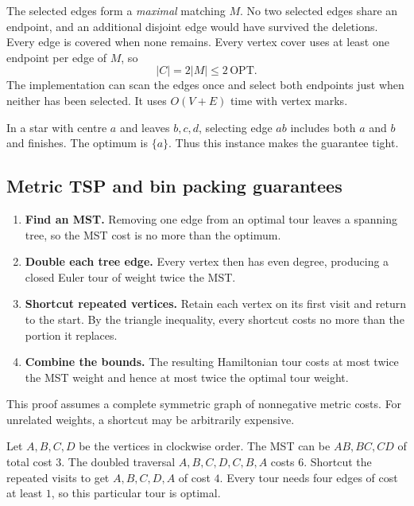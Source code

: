 \documentclass[12pt,a4paper]{article}
\begin{document}
The selected edges form a \emph{maximal} matching $M$. No two selected edges share an endpoint, and an additional disjoint edge would have survived the deletions. Every edge is covered when none remains. Every vertex cover uses at least one endpoint per edge of $M$, so
\[
|C|=2|M|\le 2\,\mathrm{OPT}.
\]
The implementation can scan the edges once and select both endpoints just when neither has been selected. It uses $O(V+E)$ time with vertex marks.
\begin{tcolorbox}[examplebox, title={A cover can attain exactly twice the optimum}]
In a star with centre $a$ and leaves $b,c,d$, selecting edge $ab$ includes both $a$ and $b$ and finishes. The optimum is $\{a\}$. Thus this instance makes the guarantee tight.
\end{tcolorbox}

\subsection{Metric TSP and bin packing guarantees}
\begin{enumerate}[leftmargin=*, itemsep=3pt, topsep=4pt]
  \item \textbf{Find an MST.} Removing one edge from an optimal tour leaves a spanning tree, so the MST cost is no more than the optimum.
  \item \textbf{Double each tree edge.} Every vertex then has even degree, producing a closed Euler tour of weight twice the MST.
  \item \textbf{Shortcut repeated vertices.} Retain each vertex on its first visit and return to the start. By the triangle inequality, every shortcut costs no more than the portion it replaces.
  \item \textbf{Combine the bounds.} The resulting Hamiltonian tour costs at most twice the MST weight and hence at most twice the optimal tour weight.
\end{enumerate}
This proof assumes a complete symmetric graph of nonnegative metric costs. For unrelated weights, a shortcut may be arbitrarily expensive.
\begin{tcolorbox}[examplebox, title={Double-tree tour on a unit square}]
Let $A,B,C,D$ be the vertices in clockwise order. The MST can be $AB,BC,CD$ of total cost $3$. The doubled traversal $A,B,C,D,C,B,A$ costs $6$. Shortcut the repeated visits to get $A,B,C,D,A$ of cost $4$. Every tour needs four edges of cost at least $1$, so this particular tour is optimal.
\end{tcolorbox}
\end{document}
